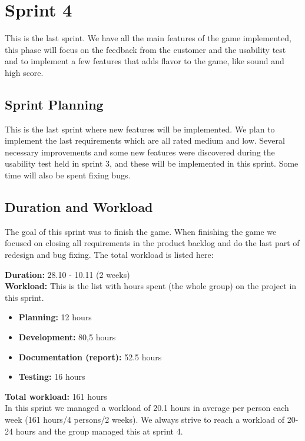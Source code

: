 \section{Sprint 4}

This is the last sprint. We have all the main features of the game implemented, this phase will focus on the feedback from the customer and the usability test and to implement a few features that adds flavor to the game, like sound and high score.

\subsection{Sprint Planning}

	This is the last sprint where new features will be implemented. We plan to implement the last 
	requirements which are all rated medium and low. Several necessary improvements and some new 
	features were discovered during the usability test held in sprint 3, and these will be implemented 
	in this sprint. Some time will also be spent fixing bugs.

\subsection{Duration and Workload}

	The goal of this sprint was to finish the game. When finishing the game we focused on closing all
	requirements in the product backlog and do the last part of redesign and bug fixing. The total
	workload is listed here:

	{\bf Duration:} 28.10 - 10.11 (2 weeks)\\
	{\bf Workload:} This is the list with hours spent (the whole group) on the project in this sprint.
	\begin{itemize}
		\item {\bf Planning:}  12 hours
		\item {\bf Development:}  80,5 hours
		\item {\bf Documentation (report):} 52.5 hours
		\item {\bf Testing:} 16 hours
	\end{itemize}
	{\bf Total workload: }  161 hours \\

	In this sprint we managed a workload of 20.1 hours in average per person each week (161 hours/4 persons/2 weeks). We always strive to reach a workload of 20-24 hours and the group managed this 
	at sprint 4.  

